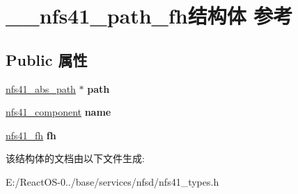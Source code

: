 \hypertarget{struct____nfs41__path__fh}{}\section{\+\_\+\+\_\+nfs41\+\_\+path\+\_\+fh结构体 参考}
\label{struct____nfs41__path__fh}
\subsection*{Public 属性}
\begin{DoxyCompactItemize}
\item 
\mbox{\label{struct____nfs41__path__fh_ad2da0c06fcb4bff20851168353a2a232}} 
\hyperlink{struct____nfs41__abs__path}{nfs41\+\_\+abs\+\_\+path} $\ast$ {\bfseries path}
\item 
\mbox{\label{struct____nfs41__path__fh_a080e3fdd2532af02609346a575d05eba}} 
\hyperlink{struct____nfs41__component}{nfs41\+\_\+component} {\bfseries name}
\item 
\mbox{\label{struct____nfs41__path__fh_a34a95b1ee6f28ed4eddfd88ba48a986c}} 
\hyperlink{struct____nfs41__fh}{nfs41\+\_\+fh} {\bfseries fh}
\end{DoxyCompactItemize}


该结构体的文档由以下文件生成\+:\begin{DoxyCompactItemize}
\item 
E\+:/\+React\+O\+S-\/0../base/services/nfsd/nfs41\+\_\+types.\+h\end{DoxyCompactItemize}
